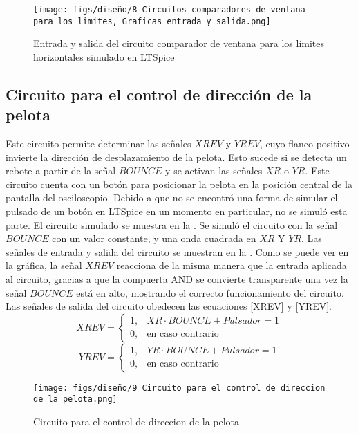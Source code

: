 \begin{figure}[H]
    \centering
    \texttt{[image: figs/diseño/8 Circuitos comparadores de ventana para los limites, Graficas entrada y salida.png]}
    \caption{Entrada y salida del circuito comparador de ventana para los límites horizontales simulado en LTSpice}
    \label{GraficaComparadorLimites}
\end{figure}


\subsection{Circuito para el control de dirección de la pelota}
Este circuito permite determinar las señales $XREV$ y $YREV$, cuyo flanco positivo invierte la dirección de desplazamiento de la pelota.
Esto sucede si se detecta un rebote a partir de la señal $BOUNCE$ y se activan las señales $XR$ o $YR$.
Este circuito cuenta con un botón para posicionar la pelota en la posición central de la pantalla del osciloscopio.
Debido a que no se encontró una forma de simular el pulsado de un botón en LTSpice en un momento en particular, no se simuló esta parte. 
El circuito simulado se muestra en la .
Se simuló el circuito con la señal $BOUNCE$ con un valor constante, y una onda cuadrada en $XR$ Y $YR$.
Las señales de entrada y salida del circuito se muestran en la .
Como se puede ver en la gráfica, la señal $XREV$ reacciona de la misma manera que la entrada aplicada al circuito, gracias a que la compuerta AND se convierte transparente una vez la señal $BOUNCE$ está en alto, mostrando el correcto funcionamiento del circuito. 
Las señales de salida del circuito obedecen las ecuaciones \eqref{XREV} y \eqref{YREV}.
\begin{equation}
    XREV = \begin{cases}
        1, & XR \cdot BOUNCE + Pulsador = 1\\
        0, & \text{en caso contrario}
    \end{cases}\label{XREV}
\end{equation}
\begin{equation}
    YREV = \begin{cases}
        1, & YR \cdot BOUNCE + Pulsador = 1\\
        0, & \text{en caso contrario}
    \end{cases}\label{YREV}
\end{equation}
\begin{figure}[H]
    \centering
    \texttt{[image: figs/diseño/9 Circuito para el control de direccion de la pelota.png]}
    \caption{Circuito para el control de direccion de la pelota }
    \label{DirecPelota}
\end{figure}

